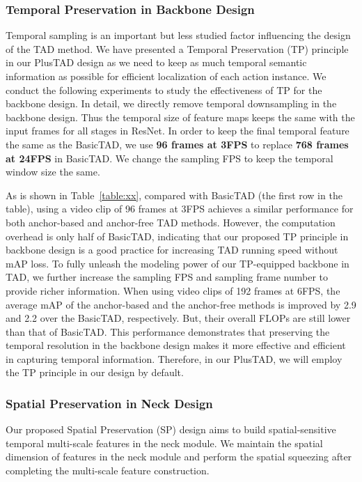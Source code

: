 \documentclass[a4paper,fleqn]{cas-dc}
\begin{document}
\subsubsection{Temporal Preservation in Backbone Design}



Temporal sampling is an important but less studied factor influencing the design of the TAD method. We have presented a Temporal Preservation (TP) principle in our PlusTAD design as we need to keep as much temporal semantic information as possible for efficient localization of each action instance. 
We conduct the following experiments to study the effectiveness of TP for the backbone design.
In detail, we directly remove  temporal downsampling in the backbone design. Thus the temporal size of feature maps keeps the same with the input frames for all stages in ResNet. In order to keep the final temporal feature the same as the BasicTAD, we use {\bf 96 frames at 3FPS} to replace {\bf 768 frames at 24FPS} in BasicTAD. We change the sampling FPS to keep the temporal window size the same. 

As is shown in Table~\ref{table:xx}, compared with BasicTAD (the first row in the table), using a video clip of 96 frames at 3FPS achieves a similar performance for both anchor-based and anchor-free TAD methods. However, the computation overhead is only half of BasicTAD, indicating that our proposed TP principle in backbone design is a good practice for increasing TAD running speed without mAP loss. 
To fully unleash the modeling power of our TP-equipped backbone in TAD, we further increase the sampling FPS and sampling frame number to provide richer information.
When using video clips of 192 frames at 6FPS, the average mAP of the anchor-based and the anchor-free methods is improved by 2.9 and 2.2 over the BasicTAD, respectively. But, their overall FLOPs are still lower than that of BasicTAD.
This performance demonstrates that preserving the temporal resolution in the backbone design makes it more effective and efficient in capturing temporal information. Therefore, in our PlusTAD, we will employ the TP principle in our design by default.

\subsubsection{Spatial Preservation in Neck Design}

Our proposed Spatial Preservation (SP) design aims to build spatial-sensitive temporal multi-scale features in the neck module. 
We maintain the spatial dimension of features in the neck module and perform the spatial squeezing after completing the multi-scale feature construction.
\end{document}
